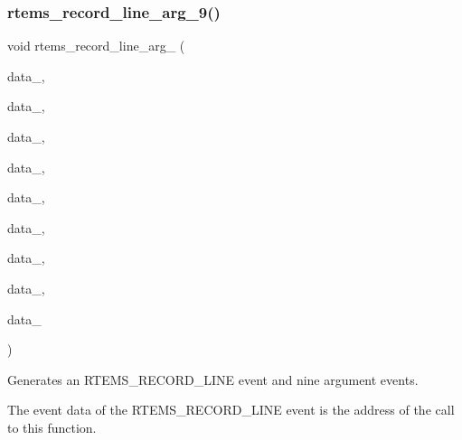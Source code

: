\subsubsection{\texorpdfstring{rtems\_record\_line\_arg\_9()}{rtems\_record\_line\_arg\_9()}}
{\footnotesize\ttfamily void rtems\+\_\+record\+\_\+line\+\_\+arg\+\_ (\begin{DoxyParamCaption}\item[{\mbox{\hyperlink{group__RTEMSRecord_gab483bd3ec735835dac6788b78c817eab}{rtems\+\_\+record\+\_\+data}}}]{data\+\_,  }\item[{\mbox{\hyperlink{group__RTEMSRecord_gab483bd3ec735835dac6788b78c817eab}{rtems\+\_\+record\+\_\+data}}}]{data\+\_,  }\item[{\mbox{\hyperlink{group__RTEMSRecord_gab483bd3ec735835dac6788b78c817eab}{rtems\+\_\+record\+\_\+data}}}]{data\+\_,  }\item[{\mbox{\hyperlink{group__RTEMSRecord_gab483bd3ec735835dac6788b78c817eab}{rtems\+\_\+record\+\_\+data}}}]{data\+\_,  }\item[{\mbox{\hyperlink{group__RTEMSRecord_gab483bd3ec735835dac6788b78c817eab}{rtems\+\_\+record\+\_\+data}}}]{data\+\_,  }\item[{\mbox{\hyperlink{group__RTEMSRecord_gab483bd3ec735835dac6788b78c817eab}{rtems\+\_\+record\+\_\+data}}}]{data\+\_,  }\item[{\mbox{\hyperlink{group__RTEMSRecord_gab483bd3ec735835dac6788b78c817eab}{rtems\+\_\+record\+\_\+data}}}]{data\+\_,  }\item[{\mbox{\hyperlink{group__RTEMSRecord_gab483bd3ec735835dac6788b78c817eab}{rtems\+\_\+record\+\_\+data}}}]{data\+\_,  }\item[{\mbox{\hyperlink{group__RTEMSRecord_gab483bd3ec735835dac6788b78c817eab}{rtems\+\_\+record\+\_\+data}}}]{data\+\_ }\end{DoxyParamCaption})}



Generates an R\+T\+E\+M\+S\+\_\+\+R\+E\+C\+O\+R\+D\+\_\+\+L\+I\+NE event and nine argument events. 

The event data of the R\+T\+E\+M\+S\+\_\+\+R\+E\+C\+O\+R\+D\+\_\+\+L\+I\+NE event is the address of the call to this function.


